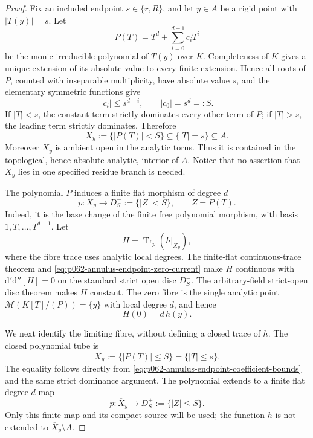 \begin{proof}
Fix an included endpoint \(s\in\{r,R\}\), and let \(y\in A\) be a rigid
point with \(|T(y)|=s\).  Let
\[
                  P(T)=T^d+\sum_{i=0}^{d-1}c_iT^i
\]
be the monic irreducible polynomial of \(T(y)\) over \(K\).  Completeness of
\(K\) gives a unique extension of its absolute value to every finite
extension.  Hence all roots of \(P\), counted with inseparable multiplicity,
have absolute value \(s\), and the elementary symmetric functions give
\begin{equation}\label{eq:p062-annulus-endpoint-coefficient-bounds}
                  |c_i|\leq s^{d-i},
                  \qquad |c_0|=s^d=:S.
\end{equation}
If \(|T|<s\), the constant term strictly dominates every other term of
\(P\); if \(|T|>s\), the leading term strictly dominates.  Therefore
\begin{equation}\label{eq:p062-annulus-endpoint-open-tube}
 X_y:=\{|P(T)|<S\}\subseteq\{|T|=s\}\subseteq A.
\end{equation}
Moreover \(X_y\) is ambient open in the analytic torus.  Thus it is contained
in the topological, hence absolute analytic, interior of \(A\).  Notice that
no assertion that \(X_y\) lies in one specified residue branch is needed.

The polynomial \(P\) induces a finite flat morphism of degree \(d\)
\begin{equation}\label{eq:p062-annulus-endpoint-open-map}
 p\colon X_y\longrightarrow D^-_S:=\{|Z|<S\},
                  \qquad Z=P(T).
\end{equation}
Indeed, it is the base change of the finite free polynomial morphism, with
basis \(1,T,\ldots,T^{d-1}\).  Let
\[
                         H=\operatorname{Tr}_p(h|_{X_y}),
\]
where the fibre trace uses analytic local degrees.  The finite-flat
continuous-trace theorem and
\eqref{eq:p062-annulus-endpoint-zero-current} make \(H\) continuous with
\(
                    \mathrm d'\mathrm d''[H]=0
\)
on the standard strict open disc \(D^-_S\).  The arbitrary-field strict-open
disc theorem makes \(H\) constant.  The zero fibre is the single analytic
point
\(
                \mathcal M(K[T]/(P))=\{y\}
\)
with local degree \(d\), and hence
\begin{equation}\label{eq:p062-annulus-endpoint-trace-at-zero}
                              H(0)=d\,h(y).
\end{equation}

We next identify the limiting fibre, without defining a closed trace of
\(h\).  The closed polynomial tube is
\begin{equation}\label{eq:p062-annulus-endpoint-closed-tube}
 \overline X_y:=\{|P(T)|\leq S\}=\{|T|\leq s\}.
\end{equation}
The equality follows directly from
\eqref{eq:p062-annulus-endpoint-coefficient-bounds} and the same strict
dominance argument.  The polynomial extends to a finite flat degree-\(d\)
map
\[
             \overline p\colon\overline X_y\longrightarrow
             D^+_S:=\{|Z|\leq S\}.
\]
Only this finite map and its compact source will be used; the function \(h\)
is not extended to \(\overline X_y\setminus A\).


\end{proof}
